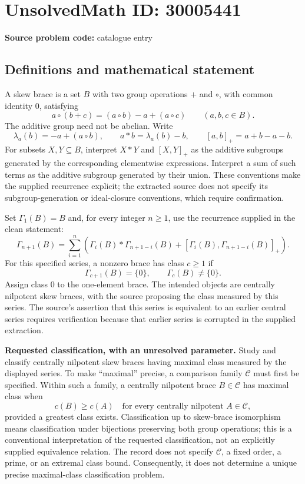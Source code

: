 \documentclass[11pt]{article}
\begin{document}
\section*{UnsolvedMath ID: 30005441}
\textbf{Source problem code:} catalogue entry
\subsection{Definitions and mathematical statement}
A skew brace is a set \(B\) with two group operations \(+\) and \(\circ\), with common identity \(0\), satisfying
\[
a\circ(b+c)=(a\circ b)-a+(a\circ c)
\qquad(a,b,c\in B).
\]
The additive group need not be abelian. Write
\[
\lambda_a(b)=-a+(a\circ b),\qquad
 a*b=\lambda_a(b)-b,\qquad
[a,b]_+=a+b-a-b.
\]
For subsets \(X,Y\subseteq B\), interpret \(X*Y\) and \([X,Y]_+\) as the additive subgroups generated by the corresponding elementwise expressions. Interpret a sum of such terms as the additive subgroup generated by their union. These conventions make the supplied recurrence explicit; the extracted source does not specify its subgroup-generation or ideal-closure conventions, which require confirmation.

Set \(\Gamma_1(B)=B\) and, for every integer \(n\geq1\), use the recurrence supplied in the clean statement:
\[
\Gamma_{n+1}(B)=
\sum_{i=1}^{n}\left(
\Gamma_i(B)*\Gamma_{n+1-i}(B)
+[\Gamma_i(B),\Gamma_{n+1-i}(B)]_+
\right).
\]
For this specified series, a nonzero brace has class \(c\geq1\) if
\[
\Gamma_{c+1}(B)=\{0\},\qquad \Gamma_c(B)\neq\{0\}.
\]
Assign class \(0\) to the one-element brace. The intended objects are centrally nilpotent skew braces, with the source proposing the class measured by this series. The source's assertion that this series is equivalent to an earlier central series requires verification because that earlier series is corrupted in the supplied extraction.

\textbf{Requested classification, with an unresolved parameter.}
Study and classify centrally nilpotent skew braces having maximal class measured by the displayed series. To make ``maximal'' precise, a comparison family \(\mathcal C\) must first be specified. Within such a family, a centrally nilpotent brace \(B\in\mathcal C\) has maximal class when
\[
c(B)\geq c(A)
\quad\text{for every centrally nilpotent }A\in\mathcal C,
\]
provided a greatest class exists. Classification up to skew-brace isomorphism means classification under bijections preserving both group operations; this is a conventional interpretation of the requested classification, not an explicitly supplied equivalence relation. The record does not specify \(\mathcal C\), a fixed order, a prime, or an extremal class bound. Consequently, it does not determine a unique precise maximal-class classification problem.
\end{document}
